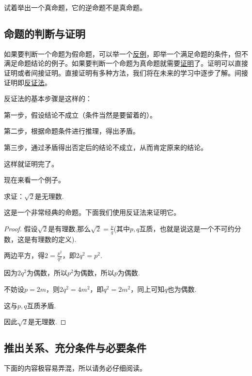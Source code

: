 \documentclass[lang=cn,math=cm,chinesefont=nofont,11pt,scheme=chinese,onecol]{elegantbook}
\begin{document}
\begin{exercise}\label{exer:202405021028}
  试着举出一个真命题，它的逆命题不是真命题。
\end{exercise}


\subsection{命题的判断与证明}

如果要判断一个命题为假命题，可以举一个\underline{反例}，即举一个满足命题的条件，但不满足命题结论的例子。如果要判断一个命题为真命题就需要\underline{证明}了。证明可以直接证明或者间接证明。直接证明有多种方法，我们将在未来的学习中逐步了解。间接证明即\underline{反证法}。

反证法的基本步骤是这样的：

第一步，假设结论不成立（条件当然是要留着的）。

第二步，根据命题条件进行推理，得出矛盾。

第三步，通过矛盾得出否定后的结论不成立，从而肯定原来的结论。

这样就证明完了。

\hspace*{\fill}

现在来看一个例子。

\begin{example}
  求证：$\sqrt{2}$是无理数.
\end{example}
这是一个非常经典的命题。下面我们使用反证法来证明它。
\begin{proof}
  假设$\sqrt{2}$是有理数,那么$\sqrt{2}=\frac{p}{q}$(其中$p,q$互质，也就是说这是一个不可约分数，这是有理数的定义).

  两边平方，得$2=\frac{p^2}{q^2}$，即$2q^2=p^2$.

  因为$2q^2$为偶数，所以$p^2$为偶数，所以$p$为偶数.

  不妨设$p=2m$，则$2q^2=4m^2$，即$q^2=2m^2$，同上可知$q$也为偶数.

  这与$p,q$互质矛盾.

  因此$\sqrt{2}$是无理数.

\end{proof}

\subsection{推出关系、充分条件与必要条件}

\begin{remark}
  下面的内容极容易弄混，所以请务必仔细阅读。
\end{remark}
\end{document}
